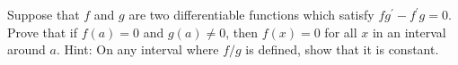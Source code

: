 \documentclass[12pt,letterpaper]{hmcpset}
\newcommand{\pn}[1]{\left( #1 \right)}
\begin{document}
\begin{problem}[11.35]

    Suppose that $f$ and $g$ are two differentiable functions which satisfy $fg^\prime - f^\prime g = 0$. Prove that if $f\pn{a} = 0$ and $g\pn{a} \ne 0$, then $f\pn{x} = 0$ for all $x$ in an interval around $a$. Hint: On any interval where $f/g$ is defined, show that it is constant.

\end{problem}

\begin{solution}

\end{solution}
\end{document}
